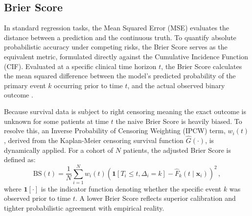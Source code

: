 \documentclass[a4paper,twoside,12pt]{report}
\begin{document}
\subsection{Brier Score}
In standard regression tasks, the Mean Squared Error (MSE) evaluates the distance between a prediction and the continuous truth. To quantify absolute probabilistic accuracy under competing risks, the Brier Score serves as the equivalent metric, formulated directly against the Cumulative Incidence Function (CIF). Evaluated at a specific clinical time horizon $t$, the Brier Score calculates the mean squared difference between the model's predicted probability of the primary event $k$ occurring prior to time $t$, and the actual observed binary outcome \citep{Graf1999}.

Because survival data is subject to right censoring meaning the exact outcome is unknown for some patients at time $t$ the naive Brier Score is heavily biased. To resolve this, an Inverse Probability of Censoring Weighting (IPCW) term, $w_i(t)$, derived from the Kaplan-Meier censoring survival function $\hat{G}(\cdot)$, is dynamically applied. For a cohort of $N$ patients, the adjusted Brier Score is defined as:
$$\text{BS}(t) = \frac{1}{N} \sum_{i=1}^N w_i(t) \left( \mathbf{1}[T_i \le t, \Delta_i = k] - \hat{F}_k(t \mid \mathbf{x}_i) \right)^2 \,,$$
where $\mathbf{1}[\cdot]$ is the indicator function denoting whether the specific event $k$ was observed prior to time $t$. A lower Brier Score reflects superior calibration and tighter probabilistic agreement with empirical reality.


\end{document}
